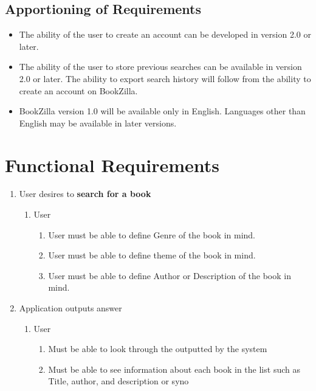 \documentclass[12pt]{article}
\begin{document}
    \subsection{Apportioning of Requirements}
    \label{sub:apportioning_of_requirements}
    \begin{itemize}
        \item The ability of the user to create an account can be developed in version 2.0 or later.
        \item The ability of the user to store previous searches can be available in version 2.0 or later. 
        The ability to export search history will follow from the ability to create an account on BookZilla.
        \item BookZilla version 1.0 will be available only in English. Languages other than English may be available in later versions.
    \end{itemize}
    
    \section{Functional Requirements}
    \label{sec:functional_requirements}
    
    \begin{enumerate}[{BE}1.]
        \item User desires to \textbf{search for a book}
        \begin{enumerate}[{VP1}.1]
            \item User
                \begin{enumerate}
                    \item User must be able to define Genre of the book in mind.
                    \item  User must be able to define theme of the book in mind.
                    \item  User must be able to define Author or Description of the book in mind.
                \end{enumerate}
        \end{enumerate}
        \item Application outputs answer
        \begin{enumerate}[{VP2}.1]
            \item User
                \begin{enumerate}
                    \item Must be able to look through the outputted by the system
                    \item Must be able to see information about each book in the list such as Title, author, and description or syno
                \end{enumerate}
        \end{enumerate}
    \end{enumerate}
    
\end{document}

